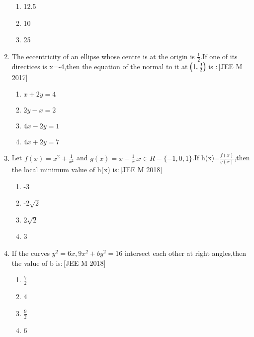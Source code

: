 \documentclass[journal,12pt,twocolumn]{IEEEtran}
\theoremstyle{remark}
\begin{document}
\begin{enumerate}
\begin{enumerate}
    \item  12.5\\
    \item  10\\
    \item  25\\
\end{enumerate}
\item The eccentricity of an ellipse whose centre is at the origin is $\frac{1}{2}$.If one of its directices is x=-4,then the equation of the normal to it at $\left(1,\frac{3}{2}\right)$ is $:$\hfill[JEE M 2017]\\
\begin{enumerate}
    \item  $x+2y=4$\\
    \item  $2y-x=2$\\
    \item  $4x-2y=1$\\
    \item  $4x+2y=7$\\
\end{enumerate}
\item Let $f(x)=x^{2}+\frac{1}{x^2}$ and $g(x)=x-\frac{1}{x}$,$x \in R-{\{-1,0,1}\}$.If h(x)=$\frac{f(x)}{g(x)}$,then the local minimum value of h(x) is$:$\hfill[JEE M 2018]\\
\begin{enumerate}
    \item  -3\\
    \item  -2$\sqrt{2}$\\
    \item   2$\sqrt{2}$\\
    \item   3\\
\end{enumerate}
\item If the curves $y^2=6x,9x^2+by^2=16$ intersect each other at right angles,then the value of b is$:$\hfill[JEE M 2018]\\
\begin{enumerate}
    \item  $\frac{7}{2}$\\
    \item  4\\
    \item  $\frac{9}{2}$\\
    \item  6\\
\end{enumerate}
\end{enumerate}
\end{document}
